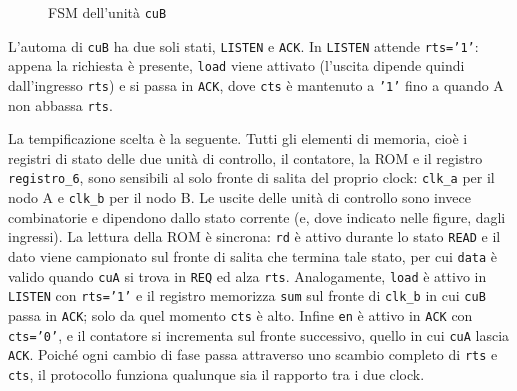\begin{figure}[htbp]
  \centering
  \caption{FSM dell'unità \texttt{cuB}}
  \label{fig:esercizio12-1:fsm-b}
\end{figure}

L'automa di \texttt{cuB} ha due soli stati, \texttt{LISTEN} e \texttt{ACK}. In \texttt{LISTEN} attende \texttt{rts=}\texttt{'1'}: appena la richiesta è presente, \texttt{load} viene attivato (l'uscita dipende quindi dall'ingresso \texttt{rts}) e si passa in \texttt{ACK}, dove \texttt{cts} è mantenuto a \texttt{'1'} fino a quando A non abbassa \texttt{rts}.

La tempificazione scelta è la seguente. Tutti gli elementi di memoria, cioè i registri di stato delle due unità di controllo, il contatore, la ROM e il registro \texttt{registro\_6}, sono sensibili al solo fronte di salita del proprio clock: \texttt{clk\_a} per il nodo A e \texttt{clk\_b} per il nodo B. Le uscite delle unità di controllo sono invece combinatorie e dipendono dallo stato corrente (e, dove indicato nelle figure, dagli ingressi). La lettura della ROM è sincrona: \texttt{rd} è attivo durante lo stato \texttt{READ} e il dato viene campionato sul fronte di salita che termina tale stato, per cui \texttt{data} è valido quando \texttt{cuA} si trova in \texttt{REQ} ed alza \texttt{rts}. Analogamente, \texttt{load} è attivo in \texttt{LISTEN} con \texttt{rts=}\texttt{'1'} e il registro memorizza \texttt{sum} sul fronte di \texttt{clk\_b} in cui \texttt{cuB} passa in \texttt{ACK}; solo da quel momento \texttt{cts} è alto. Infine \texttt{en} è attivo in \texttt{ACK} con \texttt{cts=}\texttt{'0'}, e il contatore si incrementa sul fronte successivo, quello in cui \texttt{cuA} lascia \texttt{ACK}. Poiché ogni cambio di fase passa attraverso uno scambio completo di \texttt{rts} e \texttt{cts}, il protocollo funziona qualunque sia il rapporto tra i due clock.

